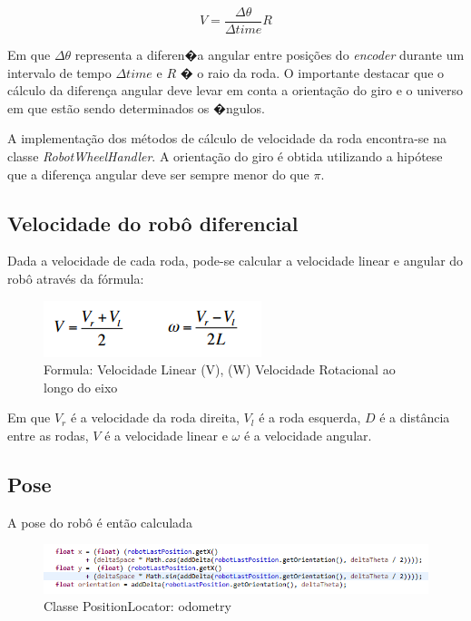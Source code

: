 \documentclass[twoside,conference,a4paper]{IEEEtran}
\begin{document}
\[ V = \frac{\Delta \theta}{\Delta time} R \]

Em que \( \Delta \theta \) representa a diferen�a angular entre posições do \textit{encoder} durante um intervalo de tempo \(\Delta time\) e \(R\) � o raio da roda. O importante destacar que o cálculo da diferença angular deve levar em conta a orientação do giro e o universo em que estão sendo determinados os �ngulos.  

A implementação dos métodos de cálculo de velocidade da roda encontra-se na classe \textit{RobotWheelHandler}. A orientação do giro é obtida utilizando a hipótese que a diferença angular deve ser sempre menor do que \( \pi \). 

\subsection{Velocidade do robô diferencial}
Dada a velocidade de cada roda, pode-se calcular a velocidade linear e angular do robô através da fórmula:

\begin{figure}[ht]
\centering
\includegraphics[width=1\hsize]{images/formula1.png}
\caption{Formula: Velocidade Linear (V), (W) Velocidade Rotacional ao longo do eixo}
\label{fig:fig1}
\end{figure}

Em que \(V_r\) é a velocidade da roda direita, \(V_l\) é a roda esquerda, \(D\) é a distância entre as rodas, \(V\) é a velocidade linear e \(\omega\) é a velocidade angular. 

\subsection{Pose}
A pose do robô é então calculada 

\begin{figure}[ht]
\centering
\includegraphics[width=1\hsize]{images/code-1.png}
\caption{Classe PositionLocator: odometry}
\label{fig:fig2}
\end{figure}
\end{document}
